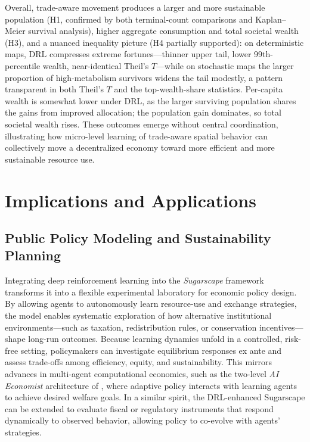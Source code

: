 \documentclass[pdflatex,sn-mathphys-num]{sn-jnl}%
\theoremstyle{thmstyleone}%
\theoremstyle{thmstyletwo}%
\theoremstyle{thmstylethree}%
\begin{document}
Overall, trade-aware movement produces a larger and more sustainable population (H1, confirmed by both terminal-count comparisons and Kaplan--Meier survival analysis), higher aggregate consumption and total societal wealth (H3), and a nuanced inequality picture (H4 partially supported): on deterministic maps, DRL compresses extreme fortunes---thinner upper tail, lower 99th-percentile wealth, near-identical Theil's $T$---while on stochastic maps the larger proportion of high-metabolism survivors widens the tail modestly, a pattern transparent in both Theil's $T$ and the top-wealth-share statistics.
Per-capita wealth is somewhat lower under DRL, as the larger surviving population shares the gains from improved allocation; the population gain dominates, so total societal wealth rises.
These outcomes emerge without central coordination, illustrating how micro-level learning of trade-aware spatial behavior can collectively move a decentralized economy toward more efficient and more sustainable resource use.


\section{Implications and Applications}
\label{sec:implications}

\subsection{Public Policy Modeling and Sustainability Planning}
Integrating deep reinforcement learning into the \textit{Sugarscape} framework transforms it into a flexible experimental laboratory for economic policy design. By allowing agents to autonomously learn resource-use and exchange strategies, the model enables systematic exploration of how alternative institutional environments---such as taxation, redistribution rules, or conservation incentives---shape long-run outcomes. Because learning dynamics unfold in a controlled, risk-free setting, policymakers can investigate equilibrium responses ex ante and assess trade-offs among efficiency, equity, and sustainability. This mirrors advances in multi-agent computational economics, such as the two-level \textit{AI Economist} architecture of \citet{Zheng2022}, where adaptive policy interacts with learning agents to achieve desired welfare goals. In a similar spirit, the DRL-enhanced Sugarscape can be extended to evaluate fiscal or regulatory instruments that respond dynamically to observed behavior, allowing policy to co-evolve with agents' strategies.
\end{document}
